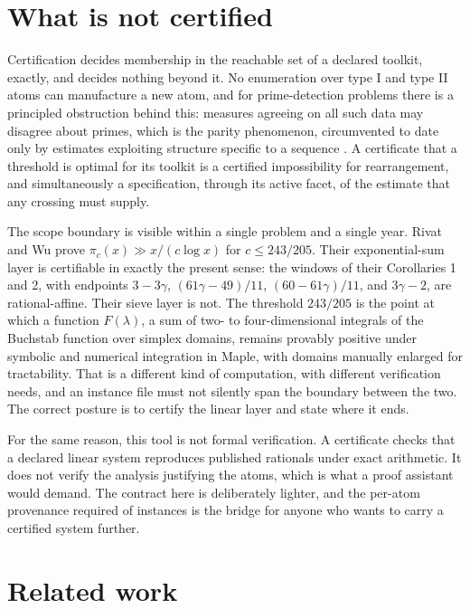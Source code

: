 \documentclass[11pt]{article}
\begin{document}
\section{What is not certified}\label{sec:limits}

Certification decides membership in the reachable set of a declared
toolkit, exactly, and decides nothing beyond it. No enumeration over
type I and type II atoms can manufacture a new atom, and for
prime-detection problems there is a principled obstruction behind
this: measures agreeing on all such data may disagree about primes,
which is the parity phenomenon, circumvented to date only by estimates
exploiting structure specific to a sequence
\cite{friedlander-iwaniec-parity}. A certificate that a threshold is
optimal for its toolkit is a certified impossibility for
rearrangement, and simultaneously a specification, through its active
facet, of the estimate that any crossing must supply.

The scope boundary is visible within a single problem and a single
year. Rivat and Wu \cite{rivat-wu} prove
$\pi_c(x)\gg x/(c\log x)$ for $c\le243/205$. Their exponential-sum
layer is certifiable in exactly the present sense: the windows of
their Corollaries 1 and 2, with endpoints $3-3\gamma$,
$(61\gamma-49)/11$, $(60-61\gamma)/11$, and $3\gamma-2$, are
rational-affine. Their sieve layer is not. The threshold $243/205$ is
the point at which a function $F(\lambda)$, a sum of two- to
four-dimensional integrals of the Buchstab function over simplex
domains, remains provably positive under symbolic and numerical
integration in Maple, with domains manually enlarged for
tractability. That is a different kind of computation, with different
verification needs, and an instance file must not silently span the
boundary between the two. The correct posture is to certify the linear
layer and state where it ends.

For the same reason, this tool is not formal verification. A
certificate checks that a declared linear system reproduces published
rationals under exact arithmetic. It does not verify the analysis
justifying the atoms, which is what a proof assistant would demand.
The contract here is deliberately lighter, and the per-atom provenance
required of instances is the bridge for anyone who wants to carry a
certified system further.

\section{Related work}\label{sec:related}
\end{document}
